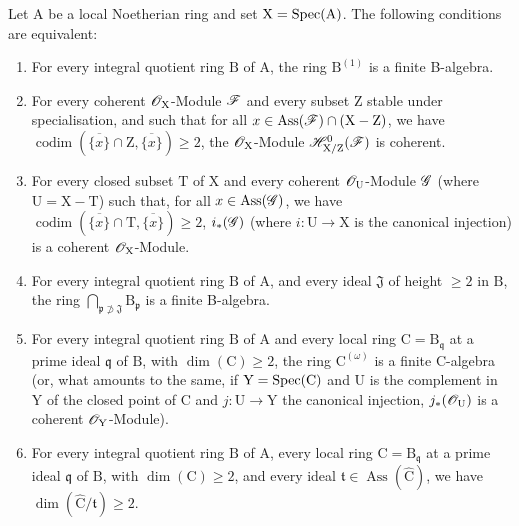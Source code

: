 \begin{proposition}[7.2.4]
\label{IV.7.2.4}
Let $\mathrm{A}$ be a local Noetherian ring and set $\mathrm{X}=\operatorname{Spec}(\mathrm{A})$.
The following conditions are equivalent:
\begin{enumerate}[label=\emph{\alph*)}]
  \item For every integral quotient ring $\mathrm{B}$ of $\mathrm{A}$, the ring $\mathrm{B}^{(1)}$ is a finite B-algebra.
  \item For every coherent $\mathscr{O}_\mathrm{X}$-Module $\mathscr{F}$ and every subset $\mathrm{Z}$ stable under specialisation, and such that for all $x\in\operatorname{Ass}(\mathscr{F})\cap(\mathrm{X}-\mathrm{Z})$, we have $\operatorname{codim}(\overline{\{x\}}\cap\mathrm{Z},\overline{\{x\}})\geqslant 2$, the $\mathscr{O}_\mathrm{X}$-Module $\mathscr{H}^0_{\mathrm{X}/\mathrm{Z}}(\mathscr{F})$ is coherent.
  \item For every closed subset $\mathrm{T}$ of $\mathrm{X}$ and every coherent $\mathscr{O}_\mathrm{U}$-Module $\mathscr{G}$ (where $\mathrm{U}=\mathrm{X}-\mathrm{T}$) such that, for all $x\in\operatorname{Ass}(\mathscr{G})$, we have $\operatorname{codim}(\overline{\{x\}}\cap\mathrm{T},\overline{\{x\}})\geqslant 2$, $i_*(\mathscr{G})$ (where $i:\mathrm{U}\to\mathrm{X}$ is the canonical injection) is a coherent $\mathscr{O}_\mathrm{X}$-Module.
  \item For every integral quotient ring $\mathrm{B}$ of $\mathrm{A}$, and every ideal $\mathfrak{J}$ of height $\geqslant 2$ in $\mathrm{B}$, the ring $\bigcap_{\mathfrak{p}\not\supset\mathfrak{J}}\mathrm{B}_\mathfrak{p}$ is a finite B-algebra.
  \item For every integral quotient ring $\mathrm{B}$ of $\mathrm{A}$ and every local ring $\mathrm{C}=\mathrm{B}_\mathfrak{q}$ at a prime ideal $\mathfrak{q}$ of $\mathrm{B}$, with $\dim(\mathrm{C})\geqslant 2$, the ring $\mathrm{C}^{(\omega)}$ is a finite C-algebra (or, what amounts to the same, if $\mathrm{Y}=\operatorname{Spec}(\mathrm{C})$ and $\mathrm{U}$ is the complement in $\mathrm{Y}$ of the closed point of $\mathrm{C}$ and $j:\mathrm{U}\to\mathrm{Y}$ the canonical injection, $j_*(\mathscr{O}_\mathrm{U})$ is a coherent $\mathscr{O}_\mathrm{Y}$-Module).
  \item For every integral quotient ring $\mathrm{B}$ of $\mathrm{A}$, every local ring $\mathrm{C}=\mathrm{B}_\mathfrak{q}$ at a prime ideal $\mathfrak{q}$ of $\mathrm{B}$, with $\dim(\mathrm{C})\geqslant 2$, and every ideal $\mathfrak{t}\in\operatorname{Ass}(\widehat{\mathrm{C}})$, we have $\dim(\widehat{\mathrm{C}}/\mathfrak{t})\geqslant 2$.
\end{enumerate}
\end{proposition}

